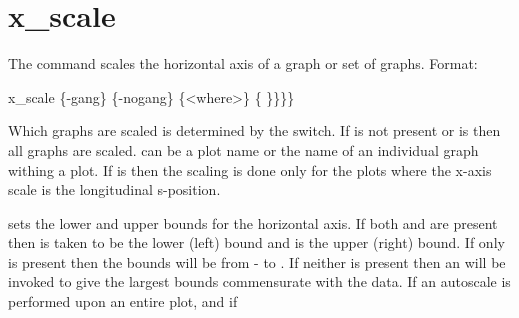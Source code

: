 {{{{{%
\section{x_scale}
\label{s:x.scale}

The  command scales the horizontal axis of a graph or set of graphs.
Format:
\begin{example}
  x_scale \{-gang\} \{-nogang\} \{<where>\} \{<value1> \}<value2>\}\}\}
\end{example}

Which graphs are scaled is determined by the  switch. If
 is not present or  is \vn{*} then all
graphs are scaled.  can be a plot name or the name of an
individual graph withing a plot.  If  is  then the
scaling is done only for the plots where the x-axis scale is the
longitudinal s-position.

\vskip 0.2in 

 sets the lower and upper bounds for the
horizontal axis.  If both  and  are present
then  is taken to be the lower (left) bound and
 is the upper (right) bound. If only  is
present then the bounds will be from - to .
If neither is present then an  will be invoked to give
the largest bounds commensurate with the data. If an autoscale is
performed upon an entire plot, and if \vn{plot%
(\sref{s:template}) is True, then the chosen scales will be the same
for all graphs. That is, a single scale is calculated so that all the
data of all the graphs is within the plot region. The affect of
\vn{plot%
or \vn{-nogang} switches.

Note: The \vn{x_scale} command will vary the number of major divisions
(set by plot%
nice looking axis. The result can be that if two plots have the same
range of data but differing major division settings, the \vn{x_scale}
command can produce differing results.

Example:
\begin{example}
  x_scale                 ! Autoscale all x-axes.
  x_scale * 0 100         ! Scale all x-axes to go from 0 to 100.
\end{example}

}}}}}}}
